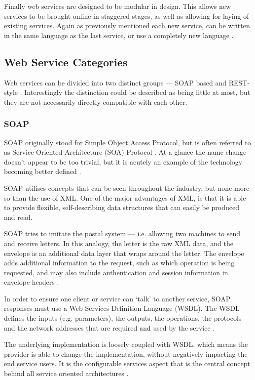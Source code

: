 Finally web services are designed to be modular in design. This allows new 
services to be brought online in staggered stages, as well as allowing for 
laying of existing services. Again as previously mentioned each new service, 
can be written in the same language as the last service, or use a completely 
new language \citep{kalin13}. 


\subsection{Web Service Categories}

Web services can be divided into two distinct groups --- SOAP based and 
REST-style \citep{kalin13}. Interestingly the distinction could be described 
as being little at most, but they are not necessarily directly compatible with 
each other. 

\subsubsection{SOAP}

SOAP originally stood for Simple Object Access Protocol, but is often referred 
to as Service Oriented Architecture (SOA) Protocol \citep{kalin13}. At a glance
the name change doesn't appear to be too trivial, but it is acutely an example 
of the technology becoming better defined \citep{kalin13}.

SOAP utilises concepts that can be seen throughout the industry, but none more 
so than the use of XML. One of the major advantages of XML, is that it is able 
to provide flexible, self-describing data structures that can easily be 
produced and read.

SOAP tries to imitate the postal system --- i.e. allowing two machines to send 
and receive letters. In this analogy, the letter is the raw XML data, and the 
envelope is an additional data layer that wraps around the letter. The envelope
adds additional information to the request, such as which operation is being 
requested, and may also include authentication and session information in 
envelope headers \citep{gershon04}.

In order to ensure one client or service can `talk' to another service, SOAP 
responses must use a Web Services Definition Language (WSDL). The WSDL defines 
the inputs (e.g. parameters), the outputs, the operations, the protocols and 
the network addresses that are required and used by the service 
\citep{gershon04}.

The underlying implementation is loosely coupled with WSDL, which means the 
provider is able to change the implementation, without negatively impacting 
the end service users. It is the configurable services aspect that is the 
central concept behind all service oriented architectures \citep{gershon04}. 


